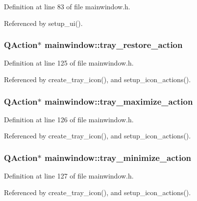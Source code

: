 Definition at line 83 of file mainwindow.h.

Referenced by setup\_\-ui().
\subsubsection{\setlength{\rightskip}{0pt plus 5cm}QAction$\ast$ {\bf mainwindow::tray\_\-restore\_\-action}\hspace{0.3cm}{\tt  [private]}}\label{classmainwindow_c3fe87e5828b746da19f9c9f952155c5}




Definition at line 125 of file mainwindow.h.

Referenced by create\_\-tray\_\-icon(), and setup\_\-icon\_\-actions().
\subsubsection{\setlength{\rightskip}{0pt plus 5cm}QAction$\ast$ {\bf mainwindow::tray\_\-maximize\_\-action}\hspace{0.3cm}{\tt  [private]}}\label{classmainwindow_a694d5989b9fecd7bf3ebb325d700b3e}




Definition at line 126 of file mainwindow.h.

Referenced by create\_\-tray\_\-icon(), and setup\_\-icon\_\-actions().
\subsubsection{\setlength{\rightskip}{0pt plus 5cm}QAction$\ast$ {\bf mainwindow::tray\_\-minimize\_\-action}\hspace{0.3cm}{\tt  [private]}}\label{classmainwindow_5acb527a6ec5a0b23515dc9b79c7139b}




Definition at line 127 of file mainwindow.h.

Referenced by create\_\-tray\_\-icon(), and setup\_\-icon\_\-actions().
